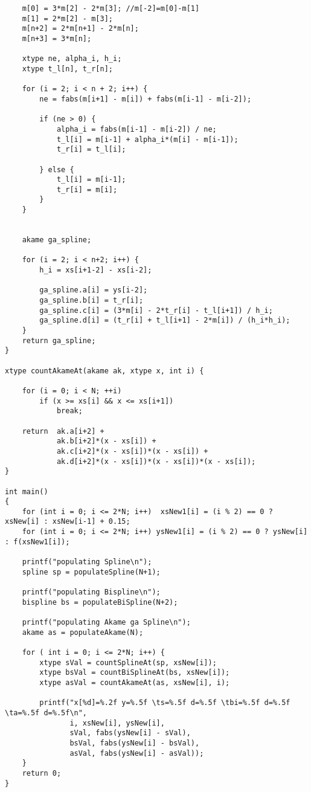 \documentclass[12pt]{article}
\begin{document}
{\begin{lstlisting}
    m[0] = 3*m[2] - 2*m[3]; //m[-2]=m[0]-m[1]
    m[1] = 2*m[2] - m[3];
    m[n+2] = 2*m[n+1] - 2*m[n];
    m[n+3] = 3*m[n];

    xtype ne, alpha_i, h_i;
    xtype t_l[n], t_r[n];

    for (i = 2; i < n + 2; i++) {
        ne = fabs(m[i+1] - m[i]) + fabs(m[i-1] - m[i-2]);

        if (ne > 0) {
            alpha_i = fabs(m[i-1] - m[i-2]) / ne;
            t_l[i] = m[i-1] + alpha_i*(m[i] - m[i-1]);
            t_r[i] = t_l[i];
            
        } else {
            t_l[i] = m[i-1];
            t_r[i] = m[i];
        }
    }


    akame ga_spline;
    
    for (i = 2; i < n+2; i++) {
        h_i = xs[i+1-2] - xs[i-2];

        ga_spline.a[i] = ys[i-2];
        ga_spline.b[i] = t_r[i];
        ga_spline.c[i] = (3*m[i] - 2*t_r[i] - t_l[i+1]) / h_i;
        ga_spline.d[i] = (t_r[i] + t_l[i+1] - 2*m[i]) / (h_i*h_i);
    }
    return ga_spline;
}

xtype countAkameAt(akame ak, xtype x, int i) {

    for (i = 0; i < N; ++i)
        if (x >= xs[i] && x <= xs[i+1])
            break;

    return  ak.a[i+2] +
            ak.b[i+2]*(x - xs[i]) +
            ak.c[i+2]*(x - xs[i])*(x - xs[i]) +
            ak.d[i+2]*(x - xs[i])*(x - xs[i])*(x - xs[i]);
}

int main()
{
    for (int i = 0; i <= 2*N; i++)  xsNew1[i] = (i % 2) == 0 ? xsNew[i] : xsNew[i-1] + 0.15;
    for (int i = 0; i <= 2*N; i++) ysNew1[i] = (i % 2) == 0 ? ysNew[i] : f(xsNew1[i]);
    
    printf("populating Spline\n");
    spline sp = populateSpline(N+1);

    printf("populating Bispline\n");
    bispline bs = populateBiSpline(N+2);

    printf("populating Akame ga Spline\n");
    akame as = populateAkame(N);

    for ( int i = 0; i <= 2*N; i++) {
        xtype sVal = countSplineAt(sp, xsNew[i]);
        xtype bsVal = countBiSplineAt(bs, xsNew[i]);
        xtype asVal = countAkameAt(as, xsNew[i], i);

        printf("x[%d]=%.2f y=%.5f \ts=%.5f d=%.5f \tbi=%.5f d=%.5f \ta=%.5f d=%.5f\n",
               i, xsNew[i], ysNew[i],
               sVal, fabs(ysNew[i] - sVal),
               bsVal, fabs(ysNew[i] - bsVal),
               asVal, fabs(ysNew[i] - asVal));
    }
    return 0;
}
        \end{lstlisting}
    }
    
\end{document}
